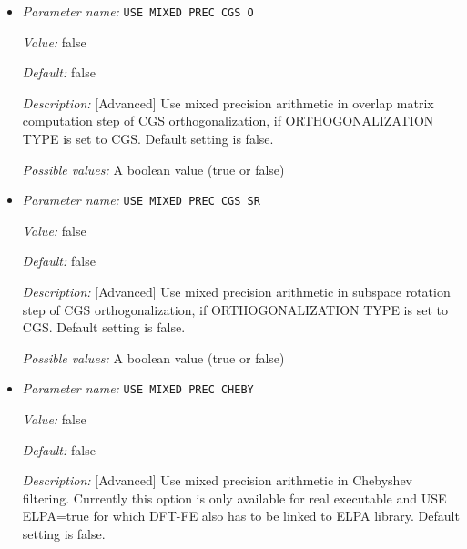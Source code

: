 \begin{itemize}
{\it Possible values:} A boolean value (true or false)
\item {\it Parameter name:} {\tt USE MIXED PREC CGS O}
\label{parameters:SCF parameters/Eigen_2dsolver parameters/USE MIXED PREC CGS O}
\label{parameters:SCF_20parameters/Eigen_2dsolver_20parameters/USE_20MIXED_20PREC_20CGS_20O}


{\it Value:} false


{\it Default:} false


{\it Description:} [Advanced] Use mixed precision arithmetic in overlap matrix computation step of CGS orthogonalization, if ORTHOGONALIZATION TYPE is set to CGS. Default setting is false.


{\it Possible values:} A boolean value (true or false)
\item {\it Parameter name:} {\tt USE MIXED PREC CGS SR}
\label{parameters:SCF parameters/Eigen_2dsolver parameters/USE MIXED PREC CGS SR}
\label{parameters:SCF_20parameters/Eigen_2dsolver_20parameters/USE_20MIXED_20PREC_20CGS_20SR}


{\it Value:} false


{\it Default:} false


{\it Description:} [Advanced] Use mixed precision arithmetic in subspace rotation step of CGS orthogonalization, if ORTHOGONALIZATION TYPE is set to CGS. Default setting is false.


{\it Possible values:} A boolean value (true or false)
\item {\it Parameter name:} {\tt USE MIXED PREC CHEBY}
\label{parameters:SCF parameters/Eigen_2dsolver parameters/USE MIXED PREC CHEBY}
\label{parameters:SCF_20parameters/Eigen_2dsolver_20parameters/USE_20MIXED_20PREC_20CHEBY}


{\it Value:} false


{\it Default:} false


{\it Description:} [Advanced] Use mixed precision arithmetic in Chebyshev filtering. Currently this option is only available for real executable and USE ELPA=true for which DFT-FE also has to be linked to ELPA library. Default setting is false.



\end{itemize}
